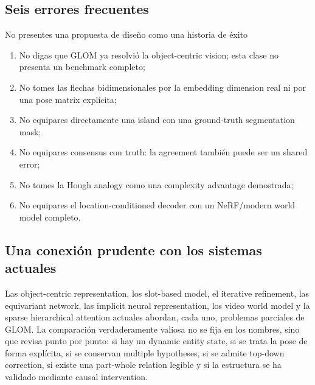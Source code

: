 \subsection{Seis errores frecuentes}

\begin{warningbox}{No presentes una propuesta de diseño como una historia de éxito}
\begin{enumerate}
  \item No digas que GLOM ya resolvió la object-centric vision; esta clase no presenta un benchmark completo;
  \item No tomes las flechas bidimensionales por la embedding dimension real ni por una pose matrix explícita;
  \item No equipares directamente una island con una ground-truth segmentation mask;
  \item No equipares consensus con truth: la agreement también puede ser un shared error;
  \item No tomes la Hough analogy como una complexity advantage demostrada;
  \item No equipares el location-conditioned decoder con un NeRF/modern world model completo.
\end{enumerate}
\end{warningbox}

\subsection{Una conexión prudente con los sistemas actuales}

Las object-centric representation, los slot-based model, el iterative refinement, las equivariant network, las implicit neural representation, los video world model y la sparse hierarchical attention actuales abordan, cada uno, problemas parciales de GLOM. La comparación verdaderamente valiosa no se fija en los nombres, sino que revisa punto por punto: si hay un dynamic entity state, si se trata la pose de forma explícita, si se conservan multiple hypotheses, si se admite top-down correction, si existe una part-whole relation legible y si la estructura se ha validado mediante causal intervention.


